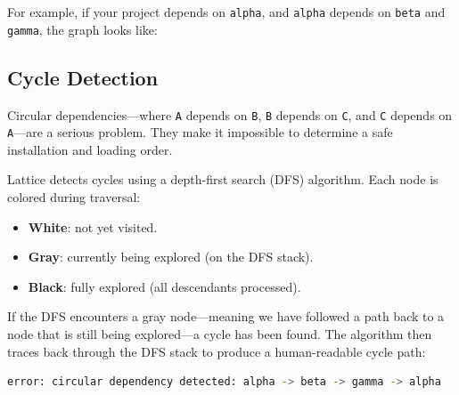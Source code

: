 For example, if your project depends on \texttt{alpha}, and \texttt{alpha} depends on \texttt{beta} and \texttt{gamma}, the graph looks like:

\begin{center}
\end{center}

\subsection{Cycle Detection}\label{subsec:cycle-detection}

Circular dependencies---where \texttt{A} depends on \texttt{B}, \texttt{B} depends on \texttt{C}, and \texttt{C} depends on \texttt{A}---are a serious problem.
They make it impossible to determine a safe installation and loading order.

Lattice detects cycles using a depth-first search (DFS) algorithm.
Each node is colored during traversal:

\begin{itemize}[nosep]
  \item \textbf{White}: not yet visited.
  \item \textbf{Gray}: currently being explored (on the DFS stack).
  \item \textbf{Black}: fully explored (all descendants processed).
\end{itemize}

If the DFS encounters a gray node---meaning we have followed a path back to a node that is still being explored---a cycle has been found.
The algorithm then traces back through the DFS stack to produce a human-readable cycle path:

\begin{lstlisting}[language=bash, numbers=none]
error: circular dependency detected: alpha -> beta -> gamma -> alpha
\end{lstlisting}

